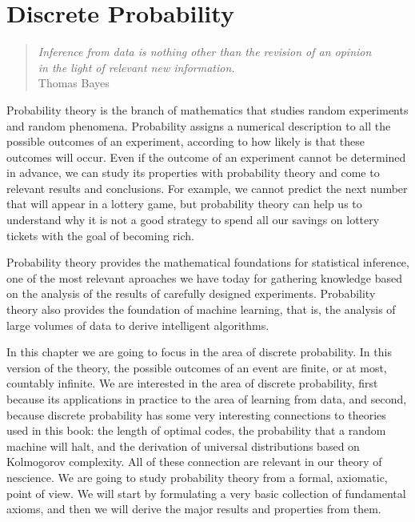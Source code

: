 %
%


\chapter{Discrete Probability}
\label{chap:Probability Theory}

\begin{quote}
\begin{flushright}
\emph{Inference from data is nothing other than the revision of an opinion\\
in the light of relevant new information.}\\
Thomas Bayes
\end{flushright}
\end{quote}
\bigskip

Probability theory is the branch of mathematics that studies random experiments and random phenomena. Probability assigns a numerical description to all the possible outcomes of an experiment, according to how likely is that these outcomes will occur. Even if the outcome of an experiment cannot be determined in advance, we can study its properties with probability theory and come to relevant results and conclusions. For example, we cannot predict the next number that will appear in a lottery game, but probability theory can help us to understand why it is not a good strategy to spend all our savings on lottery tickets with the goal of becoming rich.

Probability theory provides the mathematical foundations for statistical inference, one of the most relevant aproaches we have today for gathering knowledge based on the analysis of the results of carefully designed experiments. Probability theory also provides the foundation of machine learning, that is, the analysis of large volumes of data to derive intelligent algorithms.

In this chapter we are going to focus in the area of discrete probability. In this version of the theory, the possible outcomes of an event are finite, or at most, countably infinite. We are interested in the area of discrete probability, first because its applications in practice to the area of learning from data, and second, because discrete probability has some very interesting connections to theories used in this book: the length of optimal codes, the probability that a random machine will halt, and the derivation of universal distributions based on Kolmogorov complexity. All of these connection are relevant in our theory of nescience. We are going to study probability theory from a formal, axiomatic, point of view. We will start by formulating a very basic collection of fundamental axioms, and then we will derive the major results and properties from them. 

